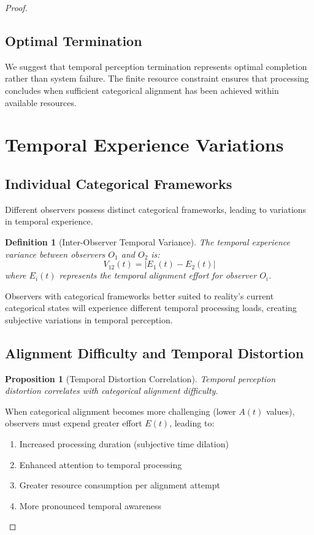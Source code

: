 \documentclass[12pt,a4paper]{article}
\newtheorem{definition}{Definition}
\newtheorem{proposition}{Proposition}
\begin{document}
\begin{proof}
\subsection{Optimal Termination}

We suggest that temporal perception termination represents optimal completion rather than system failure. The finite resource constraint ensures that processing concludes when sufficient categorical alignment has been achieved within available resources.

\section{Temporal Experience Variations}

\subsection{Individual Categorical Frameworks}

Different observers possess distinct categorical frameworks, leading to variations in temporal experience.

\begin{definition}[Inter-Observer Temporal Variance]
The temporal experience variance between observers $O_1$ and $O_2$ is:
$$V_{12}(t) = |E_1(t) - E_2(t)|$$
where $E_i(t)$ represents the temporal alignment effort for observer $O_i$.
\end{definition}

Observers with categorical frameworks better suited to reality's current categorical states will experience different temporal processing loads, creating subjective variations in temporal perception.

\subsection{Alignment Difficulty and Temporal Distortion}

\begin{proposition}[Temporal Distortion Correlation]
Temporal perception distortion correlates with categorical alignment difficulty.
\end{proposition}

When categorical alignment becomes more challenging (lower $A(t)$ values), observers must expend greater effort $E(t)$, leading to:
\begin{enumerate}
\item Increased processing duration (subjective time dilation)
\item Enhanced attention to temporal processing
\item Greater resource consumption per alignment attempt
\item More pronounced temporal awareness
\end{enumerate}


\end{proof}
\end{document}
